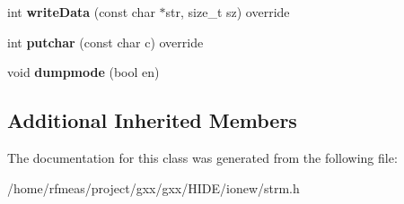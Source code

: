 \begin{DoxyCompactItemize}
\item 
int {\bfseries write\+Data} (const char $\ast$str, size\+\_\+t sz) override\hypertarget{classgxx_1_1io_1_1debug__strmout_adb8926ce207b7d278a82f63cfe3c7a83}{}\label{classgxx_1_1io_1_1debug__strmout_adb8926ce207b7d278a82f63cfe3c7a83}

\item 
int {\bfseries putchar} (const char c) override\hypertarget{classgxx_1_1io_1_1debug__strmout_a5a86485ab4721b21b9e7e7cc25784dfc}{}\label{classgxx_1_1io_1_1debug__strmout_a5a86485ab4721b21b9e7e7cc25784dfc}

\item 
void {\bfseries dumpmode} (bool en)\hypertarget{classgxx_1_1io_1_1debug__strmout_a61b908e1b1b31c3356d9a152bb1b7eda}{}\label{classgxx_1_1io_1_1debug__strmout_a61b908e1b1b31c3356d9a152bb1b7eda}

\end{DoxyCompactItemize}
\subsection*{Additional Inherited Members}


The documentation for this class was generated from the following file\+:\begin{DoxyCompactItemize}
\item 
/home/rfmeas/project/gxx/gxx/\+H\+I\+D\+E/ionew/strm.\+h\end{DoxyCompactItemize}
